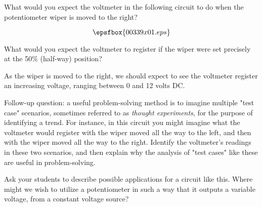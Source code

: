 

What would you expect the voltmeter in the following circuit to do when the potentiometer wiper is moved to the right?

$$\epsfbox{00339x01.eps}$$

What would you expect the voltmeter to register if the wiper were set precisely at the 50\% (half-way) position?







As the wiper is moved to the right, we should expect to see the voltmeter register an increasing voltage, ranging between 0 and 12 volts DC.

\vskip 10pt

Follow-up question: a useful problem-solving method is to imagine multiple "test case" scenarios, sometimes referred to as {\it thought experiments}, for the purpose of identifying a trend.  For instance, in this circuit you might imagine what the voltmeter would register with the wiper moved all the way to the left, and then with the wiper moved all the way to the right.  Identify the voltmeter's readings in these two scenarios, and then explain why the analysis of "test cases" like these are useful in problem-solving.







Ask your students to describe possible applications for a circuit like this.  Where might we wish to utilize a potentiometer in such a way that it outputs a variable voltage, from a constant voltage source?




